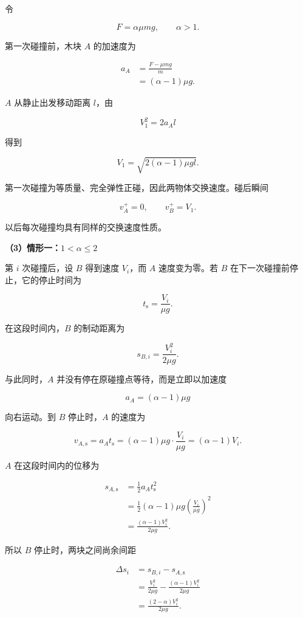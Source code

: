 \documentclass[12pt,a4paper,UTF8]{ctexart}
\begin{document}
令

\[F=\alpha\mu mg,\qquad \alpha>1.\]

第一次碰撞前，木块 \(A\) 的加速度为

\[\begin{aligned}
a_A
&=\frac{F-\mu mg}{m}\\
&=(\alpha-1)\mu g.
\end{aligned}\]

\(A\) 从静止出发移动距离 \(l\)，由

\[V_1^2=2a_Al\]

得到

\[\boxed{V_1=\sqrt{2(\alpha-1)\mu gl}}.\]

第一次碰撞为等质量、完全弹性正碰，因此两物体交换速度。碰后瞬间

\[v_A^+=0,\qquad v_B^+=V_1.\]

以后每次碰撞均具有同样的交换速度性质。

\textbf{（3）情形一：\(1<\alpha\leq2\)}

第 \(i\) 次碰撞后，设 \(B\) 得到速度 \(V_i\)，而 \(A\) 速度变为零。若
\(B\) 在下一次碰撞前停止，它的停止时间为

\[t_{\mathrm s}=\frac{V_i}{\mu g}.\]

在这段时间内，\(B\) 的制动距离为

\[s_{B,i}=\frac{V_i^2}{2\mu g}.\]

与此同时，\(A\) 并没有停在原碰撞点等待，而是立即以加速度

\[a_A=(\alpha-1)\mu g\]

向右运动。到 \(B\) 停止时，\(A\) 的速度为

\[v_{A,\mathrm s}
=a_At_{\mathrm s}
=(\alpha-1)\mu g\cdot\frac{V_i}{\mu g}
=(\alpha-1)V_i.\]

\(A\) 在这段时间内的位移为

\[\begin{aligned}
s_{A,\mathrm s}
&=\frac12a_At_{\mathrm s}^2\\
&=\frac12(\alpha-1)\mu g
\left(\frac{V_i}{\mu g}\right)^2\\
&=\frac{(\alpha-1)V_i^2}{2\mu g}.
\end{aligned}\]

所以 \(B\) 停止时，两块之间尚余间距

\[\begin{aligned}
\Delta s_i
&=s_{B,i}-s_{A,\mathrm s}\\
&=\frac{V_i^2}{2\mu g}
-\frac{(\alpha-1)V_i^2}{2\mu g}\\
&=\frac{(2-\alpha)V_i^2}{2\mu g}.
\end{aligned}\]
\end{document}
